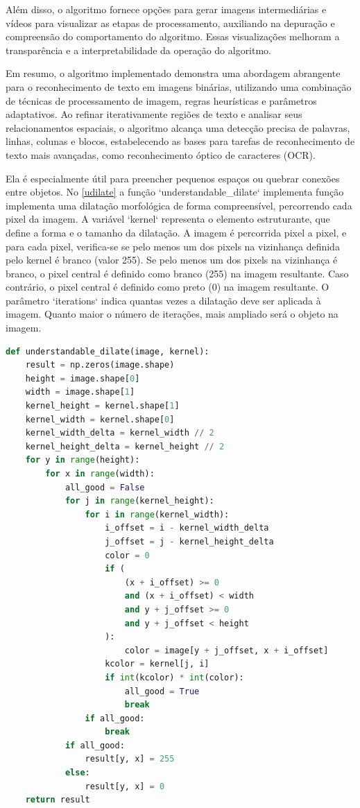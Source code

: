 \documentclass[english, 
               brazil, 
               bsc] %
               {dcomp-abntex2}
\begin{document}
Além disso, o algoritmo fornece opções para gerar imagens intermediárias e vídeos para visualizar as etapas de processamento, auxiliando na depuração e compreensão do comportamento do algoritmo. Essas visualizações melhoram a transparência e a interpretabilidade da operação do algoritmo.

Em resumo, o algoritmo implementado demonstra uma abordagem abrangente para o reconhecimento de texto em imagens binárias, utilizando uma combinação de técnicas de processamento de imagem, regras heurísticas e parâmetros adaptativos. Ao refinar iterativamente regiões de texto e analisar seus relacionamentos espaciais, o algoritmo alcança uma detecção precisa de palavras, linhas, colunas e blocos, estabelecendo as bases para tarefas de reconhecimento de texto mais avançadas, como reconhecimento óptico de caracteres (OCR).

Ela é especialmente útil para preencher pequenos espaços ou quebrar conexões entre objetos. No \autoref{udilate} a função `understandable\_dilate` implementa função implementa uma dilatação morfológica de forma compreensível, percorrendo cada pixel da imagem.
A variável `kernel` representa o elemento estruturante, que define a forma e o tamanho da dilatação.
A imagem é percorrida pixel a pixel, e para cada pixel, verifica-se se pelo menos um dos pixels na vizinhança definida pelo kernel é branco (valor 255).
Se pelo menos um dos pixels na vizinhança é branco, o pixel central é definido como branco (255) na imagem resultante.
Caso contrário, o pixel central é definido como preto (0) na imagem resultante.
O parâmetro `iterations` indica quantas vezes a dilatação deve ser aplicada à imagem. Quanto maior o número de iterações, mais ampliado será o objeto na imagem.

\begin{codigo}[h]
  \caption{\small .}
 \label{udilate}
\begin{lstlisting}[language=python]
def understandable_dilate(image, kernel):
    result = np.zeros(image.shape)
    height = image.shape[0]
    width = image.shape[1]
    kernel_height = kernel.shape[1]
    kernel_width = kernel.shape[0]
    kernel_width_delta = kernel_width // 2
    kernel_height_delta = kernel_height // 2
    for y in range(height):
        for x in range(width):
            all_good = False
            for j in range(kernel_height):
                for i in range(kernel_width):
                    i_offset = i - kernel_width_delta
                    j_offset = j - kernel_height_delta
                    color = 0
                    if (
                        (x + i_offset) >= 0
                        and (x + i_offset) < width
                        and y + j_offset >= 0
                        and y + j_offset < height
                    ):
                        color = image[y + j_offset, x + i_offset]
                    kcolor = kernel[j, i]
                    if int(kcolor) * int(color):
                        all_good = True
                        break
                if all_good:
                    break
            if all_good:
                result[y, x] = 255
            else:
                result[y, x] = 0
    return result
\end{lstlisting}
\end{codigo}
\end{document}
